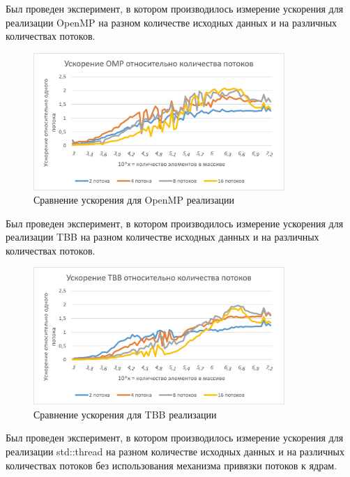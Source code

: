 \documentclass{report}
\begin{document}
\par Был проведен эксперимент, в котором производилось измерение ускорения для реализации OpenMP на разном количестве исходных данных и на различных количествах потоков.
\begin{figure}[H]
    \centering
    \includegraphics[width=0.85\textwidth]{../modules/task_1/ivanov_arkady_rbms/images/boost_omp.jpg}
    \caption{Сравнение ускорения для OpenMP реализации}
    \label{fig:my_label_3}
\end{figure}
\par Был проведен эксперимент, в котором производилось измерение ускорения для реализации TBB на разном количестве исходных данных и на различных количествах потоков.
\begin{figure}[H]
    \centering
    \includegraphics[width=0.85\textwidth]{../modules/task_1/ivanov_arkady_rbms/images/boost_tbb.jpg}
    \caption{Сравнение ускорения для TBB реализации}
    \label{fig:my_label_4}
\end{figure}
\par Был проведен эксперимент, в котором производилось измерение ускорения для реализации std::thread на разном количестве исходных данных и на различных количествах потоков без использования механизма привязки потоков к ядрам.
\end{document}
